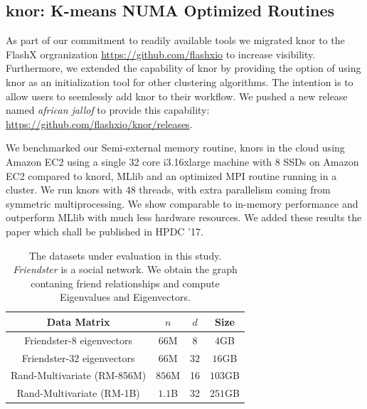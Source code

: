 \documentclass[simplex.tex]{subfiles}
\begin{document}
\subsection{knor: K-means NUMA Optimized Routines}


As part of our commitment to readily available tools
we migrated \textsf{knor} to the FlashX orgranization
\href{https://github.com/flashxio}{https://github.com/flashxio} to increase
visibility. Furthermore, we extended the capability of \textsf{knor} by
providing the option of using \textsf{knor} as an initialization tool
for other clustering algorithms. The intention is to allow users to
seemlessly add \textsf{knor} to their workflow.
We pushed a new release named \textit{african jallof} to
provide this capability: \\
\href{https://github.com/flashxio/knor/releases}
{https://github.com/flashxio/knor/releases}.

We benchmarked our Semi-external memory routine, \textsf{knors} in the cloud
using Amazon EC2 using a single 32 core i3.16xlarge machine with 8 SSDs on Amazon EC2 compared
to \textsf{knord}, MLlib and an optimized MPI routine running in a cluster.
We run \textsf{knors} with 48 threads, with extra parallelism coming
from symmetric multiprocessing. We show comparable to in-memory
performance and outperform MLlib with much less hardware resources.
We added these results the paper which shall be published in HPDC '17.

\begin{table}[!htb]
    \caption{The datasets under evaluation in this study. \textit{Friendster}
        is a social network. We obtain the graph contaning friend relationships and
compute Eigenvalues and Eigenvectors.}
\vspace{-10pt}
\begin{center}
\footnotesize
\begin{tabular}{|c|c|c|c|}
\hline
\textbf{Data Matrix} & $n$ & $d$ & \textbf{Size}\\
\hline
Friendster-8 eigenvectors & $66$M &
  $8$ & $4$GB\\
\hline
Friendster-32 eigenvectors & $66$M &
  $32$ & $16$GB\\
\hline
Rand-Multivariate (RM-856M)& $856$M & 16 & $103$GB\\
\hline
Rand-Multivariate (RM-1B)& $1.1$B & 32 & $251$GB\\
\hline
\end{tabular}
\normalsize
\end{center}
\label{tbl:matrices}
\end{table}
\end{document}
